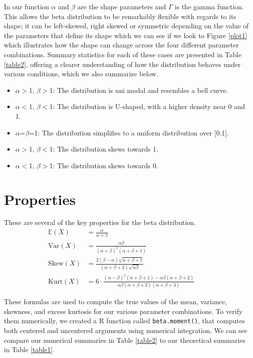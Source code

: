 \documentclass{article}\usepackage[]{graphicx}\usepackage[]{xcolor}
\begin{document}
\begin{multicols}{2}
In our function $\alpha$ and $\beta$ are the shape parameters and $\Gamma$ is the gamma function. This allows the beta distribution to be remarkably flexible with regards to its shape; it can be left-skewed, right skewed or symmetric depending on the value of the parameters that define its shape which we can see if we look to Figure \ref{plot1} which illustrates how the shape can change across the four different parameter combinations. Summary statistics for each of these cases are presented in Table \ref{table2}, offering a clearer understanding of how the distribution behaves under various conditions, which we also summarize below. 
\begin{itemize}
\item $\alpha$$>$1, $\beta$$>$1: The distribution is uni modal and resembles a bell curve.
\item $\alpha$$<$1, $\beta$$<$1: The distribution is U-shaped, with a higher density near 0 and 1.
\item $\alpha$=$\beta$=1: The distribution simplifies to a uniform distribution over [0,1].
\item $\alpha$$>$1, $\beta$$<$1: The distribution skews towards 1.
\item $\alpha$$<$1, $\beta$$>$1: The distribution skews towards 0.
\end{itemize}


\section{Properties}
These are several of the key properties for the beta distribution.
\begin{align}
\mathbb{E}(X) &= \frac{\alpha}{\alpha + \beta} && \tag{Mean} \\
\text{Var}(X) &= \frac{\alpha \beta}{(\alpha + \beta)^2(\alpha + \beta + 1)} && \tag{Variance}  \\
\text{Skew}(X) &= \frac{2(\beta - \alpha)\sqrt{\alpha + \beta + 1}}{(\alpha + \beta + 2)\sqrt{\alpha \beta}} && \tag{Skewness} \\
\text{Kurt}(X) &= 6 \cdot \frac{(\alpha - \beta)^2(\alpha + \beta + 1) - \alpha \beta (\alpha + \beta + 2)}{\alpha \beta (\alpha + \beta + 2)(\alpha + \beta + 3)} && \tag{Excess Kurtosis}
\end{align}

These formulas are used to compute the true values of the mean, variance, skewness, and excess kurtosis for our various parameter combinations. To verify them numerically, we created a R function called \verb|beta.moment()|, that computes both centered and uncentered arguments using numerical integration. We can see compare our numerical summaries in Table \ref{table2} to our theoretical summaries in Table \ref{table1}.


\end{multicols}
\end{document}
